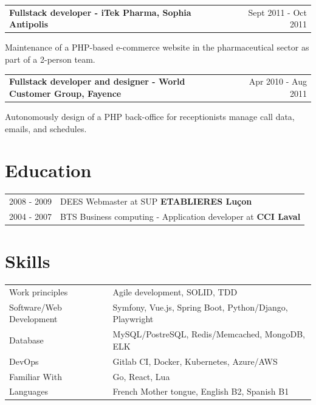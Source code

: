 \documentclass[a4paper,10pt]{article}
\makeatletter
\newenvironment{jobshort}[2]
{
    \begin{tabularx}{\linewidth}{@{}l X r@{}}
    \textbf{#1} & \hfill &  #2 \\[3.75pt]
    \end{tabularx}
    \begin{minipage}[t]{\linewidth}
    \begin{itemize}[nosep,leftmargin=1em,label=--]
}
{
    \end{itemize}
    \end{minipage}
}
\makeatother
\begin{document}
    \begin{jobshort}{Fullstack developer - iTek Pharma, Sophia Antipolis}{Sept 2011 - Oct 2011}
        Maintenance of a PHP-based e-commerce website in the pharmaceutical sector as part of a 2-person team.
    \end{jobshort}

    \begin{jobshort}{Fullstack developer and designer - World Customer Group, Fayence}{Apr 2010 - Aug 2011}
        Autonomously design of a PHP back-office for receptionists manage call data, emails, and schedules.
    \end{jobshort}

    \section{Education}
    \begin{tabularx}{\linewidth}{@{}l X@{}}
        2008 - 2009 & DEES Webmaster at SUP \textbf{ETABLIERES Luçon} \\
        2004 - 2007 & BTS Business computing - Application developer at \textbf{CCI Laval} \\
    \end{tabularx}

    \section{Skills}
    \begin{tabularx}{\linewidth}{@{}l X@{}}
        Work principles &  \normalsize{Agile development, SOLID, TDD}\\
        Software/Web Development &  \normalsize{Symfony, Vue.js, Spring Boot, Python/Django, Playwright}\\
        Database &  \normalsize{ MySQL/PostreSQL, Redis/Memcached, MongoDB, ELK} \\
        DevOps & \normalsize{Gitlab CI, Docker, Kubernetes, Azure/AWS} \\
        Familiar With &  \normalsize{Go, React, Lua} \\
        Languages &  \normalsize{French Mother tongue, English B2, Spanish B1} \\
    \end{tabularx}
\end{document}
